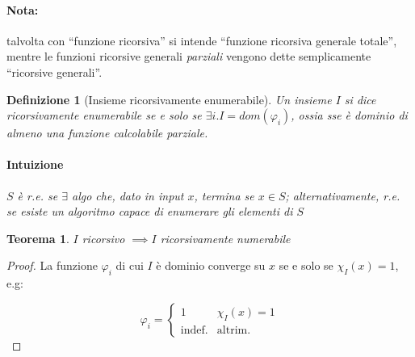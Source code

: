 \documentclass[a4paper,10pt,oneside]{article}
\theoremstyle{break}
\newtheorem{deff}{Definizione}[section]
\newtheorem{teo}{Teorema}[subsection]
\begin{document}
\paragraph{Nota:} talvolta con ``funzione ricorsiva'' si intende ``funzione ricorsiva generale totale'', mentre le funzioni ricorsive generali \emph{parziali} vengono dette semplicamente ``ricorsive generali''.

\begin{deff}[Insieme ricorsivamente enumerabile]

Un insieme $I$ si dice \emph{ricorsivamente enumerabile} se e solo se $\exists i.I = dom(\varphi_i)$, ossia sse è dominio di almeno una funzione calcolabile parziale. 
\paragraph{Intuizione} 
$S$ è r.e. se $\exists$ algo che, dato in input $x$, termina se $x \in S$; alternativamente, r.e. se esiste un algoritmo capace di enumerare gli elementi di $S$

\end{deff}
\newpage
\begin{mdframed}
\begin{teo} $I$ ricorsivo $\implies I$ ricorsivamente numerabile
\end{teo}
\begin{multicols}{2}
\begin{proof}
 La funzione $\varphi_i$ di cui $I$ è dominio converge su $x$ se e solo se $\chi_I(x) = 1$, e.g:

  \[ \varphi_i = \begin{cases}
                  1 & \chi_I(x) = 1\\
                  \text{indef.} & \text{altrim.}
                 \end{cases}
 \]

\end{proof}


\end{multicols}

\end{mdframed}
\end{document}
